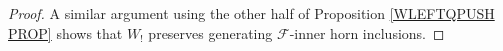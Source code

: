 \documentclass[a4paper,10pt
,draft
]{article}%
\numberwithin{equation}{section}
\numberwithin{figure}{section}
\theoremstyle{definition} %
\newcommand{\set}[1]{\left\{#1\right\}}%
\newcommand{\vect}[1]{\text{\overrightharp{\ensuremath{#1}}}}
\newcommand{\sOp}{\ensuremath{\mathsf{sOp}}}%
\newcommand{\F}{\ensuremath{\mathcal F}}
\newcommand{\1}{\ensuremath{\mathbbm 1}}%
\begin{document}
\begin{proof}
      A similar argument using the other half of Proposition \ref{WLEFTQPUSH PROP} shows that $W_!$ preserves generating $\F$-inner horn inclusions.
\end{proof}
\end{document}

